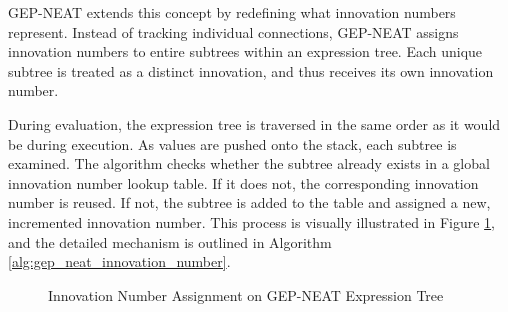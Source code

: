 \parbreak\noindent GEP-NEAT extends this concept by redefining what innovation numbers represent. Instead of tracking individual connections, GEP-NEAT assigns innovation numbers to entire subtrees within an expression tree. Each unique subtree is treated as a distinct innovation, and thus receives its own innovation number. 

\parbreak\noindent During evaluation, the expression tree is traversed in the same order as it would be during execution. As values are pushed onto the stack, each subtree is examined. The algorithm checks whether the subtree already exists in a global innovation number lookup table. If it does not, the corresponding innovation number is reused. If not, the subtree is added to the table and assigned a new, incremented innovation number. This process is visually illustrated in Figure \ref{fig:gep_neat_innovation_number}, and the detailed mechanism is outlined in Algorithm \ref{alg:gep_neat_innovation_number}.

\parbreak
\begin{figure}[H] %
	\centering %
	\caption{Innovation Number Assignment on GEP-NEAT Expression Tree}
	\label{fig:gep_neat_innovation_number} %
\end{figure}

